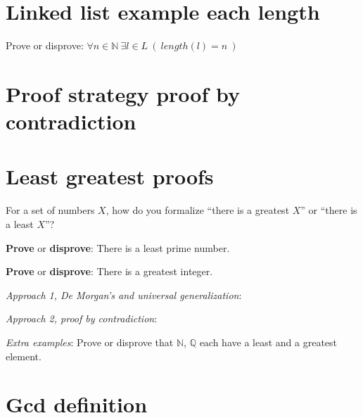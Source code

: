 \documentclass[12pt, oneside]{article}
\begin{document}
\section*{Linked list example each length}


Prove or disprove: $\forall n \in \mathbb{N} ~\exists l \in L ~(~length(l) = n~)$

\vspace{300pt} \vfill
\section*{Proof strategy proof by contradiction}



 \vfill
\section*{Least greatest proofs}


For a set of numbers $X$, how do you formalize ``there is a greatest $X$'' 
or ``there is a least $X$''?

\vspace{30pt}

{\bf Prove} or {\bf  disprove}:  There is a least prime number.

\vspace{100pt}

{\bf Prove} or {\bf  disprove}: There is a greatest integer. 

{\it Approach 1, De Morgan's and universal generalization}: 

\vspace{100pt}

{\it Approach 2, proof by contradiction}: 

\vspace{200pt}

{\it Extra examples}: 
Prove or disprove that $\mathbb{N}$,  $\mathbb{Q}$ each have a
least and a greatest element. 
 \vfill
\section*{Gcd definition}
\end{document}
